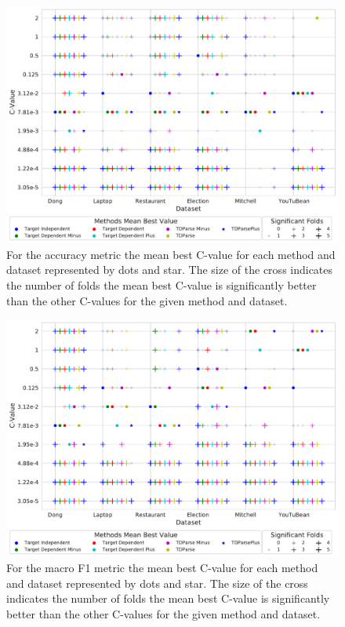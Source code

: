 \begin{figure}[!h]
    \centering
    \includegraphics[scale=0.47]{images/reproducibility/Parameters/C_Value/C_Sig_Plot_Accuracy.pdf}
    \caption{For the accuracy metric the mean best C-value for each method and dataset represented by dots and star. The size of the cross indicates the number of folds the mean best C-value is significantly better than the other C-values for the given method and dataset.}
    \label{fig:repro_parameters_c_values_accuracy}
\end{figure}
\begin{figure}[!h]
    \centering
    \includegraphics[scale=0.47]{images/reproducibility/Parameters/C_Value/C_Sig_Plot_F1.pdf}
    \caption{For the macro F1 metric the mean best C-value for each method and dataset represented by dots and star. The size of the cross indicates the number of folds the mean best C-value is significantly better than the other C-values for the given method and dataset.}
    \label{fig:repro_parameters_c_values_macro_f1}
\end{figure}
\clearpage

